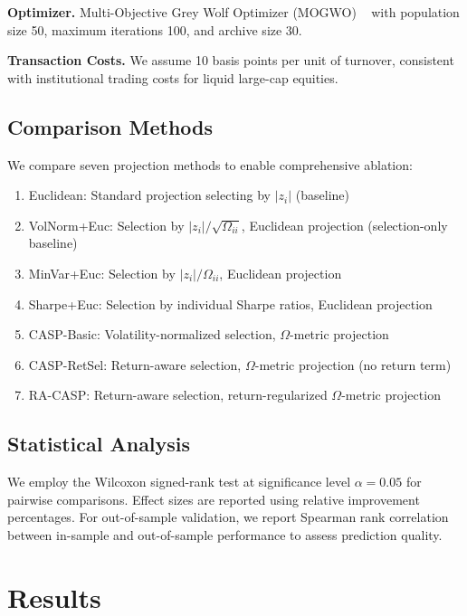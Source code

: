 \documentclass[10pt,twocolumn,a4paper]{article}
\begin{document}
\textbf{Optimizer.} Multi-Objective Grey Wolf Optimizer (MOGWO) ~\cite{mirjalili2016multi} with population size 50, maximum iterations 100, and archive size 30.

\textbf{Transaction Costs.} We assume 10 basis points per unit of turnover, consistent with institutional trading costs for liquid large-cap equities.

\subsection{Comparison Methods}

We compare seven projection methods to enable comprehensive ablation:

\begin{enumerate}
    \item Euclidean: Standard projection selecting by $|z_i|$ (baseline)
    \item VolNorm+Euc: Selection by $|z_i|/\sqrt{\Omega_{ii}}$, Euclidean projection (selection-only baseline)
    \item MinVar+Euc: Selection by $|z_i|/\Omega_{ii}$, Euclidean projection
    \item Sharpe+Euc: Selection by individual Sharpe ratios, Euclidean projection
    \item CASP-Basic: Volatility-normalized selection, $\Omega$-metric projection
    \item CASP-RetSel: Return-aware selection, $\Omega$-metric projection (no return term)
    \item RA-CASP: Return-aware selection, return-regularized $\Omega$-metric projection
\end{enumerate}

\subsection{Statistical Analysis}

We employ the Wilcoxon signed-rank test at significance level $\alpha = 0.05$ for pairwise comparisons. Effect sizes are reported using relative improvement percentages. For out-of-sample validation, we report Spearman rank correlation between in-sample and out-of-sample performance to assess prediction quality.

\section{Results}
\label{sec:results}
\end{document}
